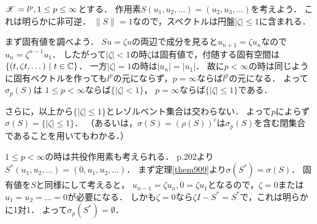         \begin{Example}[例9.17, p.217]
            $\mathscr{X}=l^p, 1 \leq p \leq \infty$とする．
            作用素$S(u_1,u_2,\dots)=(u_2,u_3,\dots)$を考えよう．
            これは明らかに非可逆．
            $\|S\|=1$なので，スペクトルは円盤$|\zeta| \leq 1$に含まれる．

            まず固有値を調べよう．
            $S u=\zeta u$の両辺で成分を見ると$u_{n+1}=\zeta u_{n}$なので$u_n=\zeta^{n-1} u_1$．
            したがって$|\zeta|<1$の時$\zeta$は固有値で，付随する固有空間は$\{(t, \zeta t, \dots) ~|~ t \in \mathbb{C} \}$．
            一方$|\zeta|=1$の時は$|u_n|=|u_1|$．
            故に$p<\infty$の時は同じように固有ベクトルを作っても$l^p$の元にならず，$p=\infty$ならば$l^p$の元になる．
            よって$\sigma_p(S)$は
            $1 \leq p < \infty$ならば$\{ |\zeta| < 1 \}$，
            $p=\infty$ならば$\{|\zeta| \leq 1\}$である．

            さらに，以上から$\{|\zeta| \leq 1\}$とレゾルベント集合は交わらない．
            よって$p$によらず$\sigma(S)=\{|\zeta| \leq 1\}$．
            （あるいは，$\sigma(S)=(\rho(S))^c$は$\sigma_p(S)$を含む閉集合であることを用いてもわかる．）

            $1 \leq p < \infty$の時は共役作用素も考えられる．
            p.202より$S^* (u_1,u_2,\dots)=(0,u_1,u_2,\dots)$．
            まず定理\ref{them909}より$\sigma(S^*)=\sigma(S)$．
            固有値を$S$と同様にして考えると，
            $u_{n-1}=\zeta u_n, 0=\zeta u_1$となるので，$\zeta=0$または$u_1=u_2=\dots=0$が必要になる．
            しかも$\zeta=0$なら$\zeta I-S^*=S^*$で，これは明らかに1対1．
            よって$\sigma_p(S^*)=\emptyset$．
        \end{Example}

